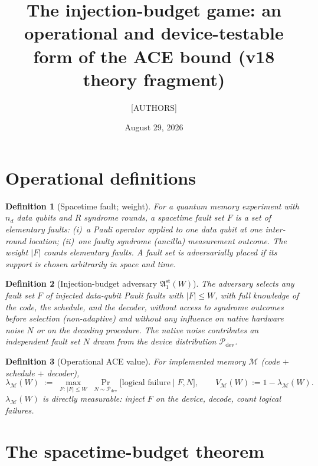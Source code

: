 \documentclass[10pt,twocolumn]{revtex4-2}
\newtheorem{definition}{Definition}
\begin{document}
\title{The injection-budget game: an operational and device-testable\\
form of the ACE bound (v18 theory fragment)}
\author{[AUTHORS]}
\date{August 29, 2026}
\maketitle

\section{Operational definitions}

\begin{definition}[Spacetime fault; weight]\label{def:fault}
For a quantum memory experiment with $n_d$ data qubits and $R$ syndrome
rounds, a \emph{spacetime fault set} $F$ is a set of elementary faults:
(i)~a Pauli operator applied to one data qubit at one inter-round
location; (ii)~one faulty syndrome (ancilla) measurement outcome. The
\emph{weight} $|F|$ counts elementary faults. A fault set is
\emph{adversarially placed} if its support is chosen arbitrarily in space
and time.
\end{definition}

\begin{definition}[Injection-budget adversary $\mathfrak{A}_1^{\mathrm{st}}(W)$]
\label{def:adversary}
The adversary selects any fault set $F$ of injected data-qubit Pauli
faults with $|F|\le W$, with full knowledge of the code, the schedule,
and the decoder, \emph{without} access to syndrome outcomes before
selection (non-adaptive) and without any influence on native hardware
noise $N$ or on the decoding procedure. The native noise contributes an
independent fault set $N$ drawn from the device distribution
$\mathcal{P}_{\mathrm{dev}}$.
\end{definition}

\begin{definition}[Operational ACE value]\label{def:acevalue}
For implemented memory $\mathcal{M}$ (code $+$ schedule $+$ decoder),
\[
\lambda_{\mathcal{M}}(W)\;:=\;\max_{F:\,|F|\le W}\;
\Pr_{N\sim\mathcal{P}_{\mathrm{dev}}}\!\big[\text{logical failure}\mid F,N\big],
\qquad V_{\mathcal{M}}(W):=1-\lambda_{\mathcal{M}}(W).
\]
$\lambda_{\mathcal{M}}(W)$ is directly measurable: inject $F$ on the
device, decode, count logical failures.
\end{definition}

\section{The spacetime-budget theorem}
\end{document}
